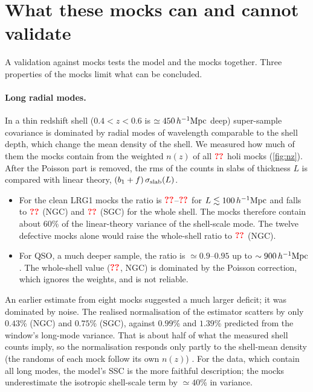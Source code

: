 \section{What these mocks can and cannot validate}
\label{sec:limits}

A validation against mocks tests the model and the mocks together. Three properties of the mocks limit what can be concluded.

\paragraph{Long radial modes.} In a thin redshift shell ($0.4<z<0.6$ is $\simeq450\,h^{-1}\mathrm{Mpc}$ deep) super-sample covariance is dominated by radial modes of wavelength comparable to the shell depth, which change the mean density of the shell. We measured how much of them the mocks contain from the weighted $n(z)$ of all $\val{nNZmocks}$ holi mocks (\cref{fig:nz}). After the Poisson part is removed, the rms of the counts in slabs of thickness $L$ is compared with linear theory, $(b_1+f)\,\sigma_{\rm slab}(L)$.
\begin{itemize}
\item For the clean LRG1 mocks the ratio is $\val{nz/LRG1/NGC/clean/23}$--$\val{nz/LRG1/NGC/clean/91}$ for $L\lesssim100\,h^{-1}\mathrm{Mpc}$ and falls to $\val{nz/LRG1/NGC/clean/454}$ (NGC) and $\val{nz/LRG1/SGC/clean/454}$ (SGC) for the whole shell. The mocks therefore contain about 60\% of the linear-theory variance of the shell-scale mode. The twelve defective mocks alone would raise the whole-shell ratio to $\val{nz/LRG1/NGC/all/454}$ (NGC).
\item For QSO, a much deeper sample, the ratio is $\simeq0.9$--$0.95$ up to $\sim900\,h^{-1}\mathrm{Mpc}$. The whole-shell value ($\val{nz/QSO/NGC/clean/1740}$, NGC) is dominated by the Poisson correction, which ignores the weights, and is not reliable.
\end{itemize}
An earlier estimate from eight mocks suggested a much larger deficit; it was dominated by noise. The realised normalisation of the estimator scatters by only $0.43$\% (NGC) and $0.75$\% (SGC), against $0.99$\% and $1.39$\% predicted from the window's long-mode variance. That is about half of what the measured shell counts imply, so the normalisation responds only partly to the shell-mean density (the randoms of each mock follow its own $n(z)$) . For the data, which contain all long modes, the model's SSC is the more faithful description; the mocks underestimate the isotropic shell-scale term by $\simeq40$\% in variance.

